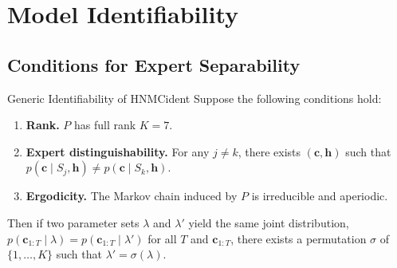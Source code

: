 \documentclass[11pt, a4paper]{article}
\newcommand{\bh}{\mathbf{h}}
\newcommand{\bc}{\mathbf{c}}
\begin{document}
\section{Model Identifiability}

\subsection{Conditions for Expert Separability}

\begin{theorem}{Generic Identifiability of HNMC}{ident}
Suppose the following conditions hold:
\begin{enumerate}[label=\textbf{(C\arabic*)}, noitemsep]
  \item \textbf{Rank.}\; $P$ has full rank $K=7$.
  \item \textbf{Expert distinguishability.}\;
        For any $j\ne k$, there exists $(\bc,\bh)$ such that
        $p(\bc\mid S_j,\bh)\ne p(\bc\mid S_k,\bh)$.
  \item \textbf{Ergodicity.}\;
        The Markov chain induced by $P$ is irreducible and aperiodic.
\end{enumerate}
Then if two parameter sets $\lambda$ and $\lambda'$ yield the same joint
distribution, $p(\bc_{1:T}\mid\lambda)=p(\bc_{1:T}\mid\lambda')$ for all
$T$ and $\bc_{1:T}$, there exists a permutation $\sigma$ of $\{1,\ldots,K\}$
such that $\lambda' = \sigma(\lambda)$.
\end{theorem}
\end{document}

